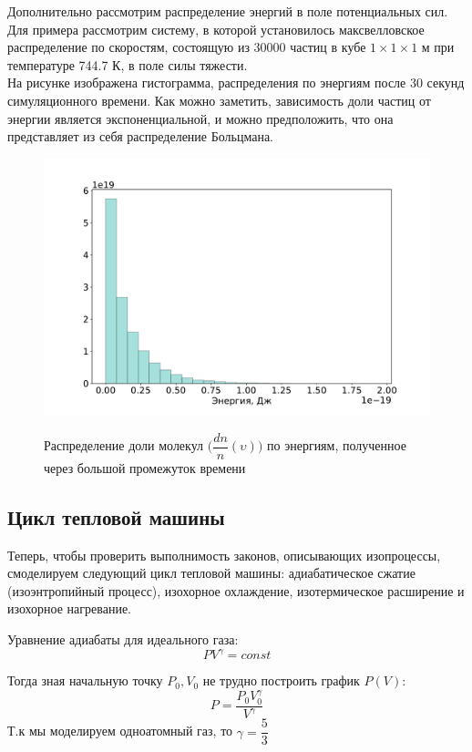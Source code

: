 \documentclass[twoside,twocolumn, 11pt]{article}
\theoremstyle{plain}
\theoremstyle{definition}
\begin{document}
Дополнительно рассмотрим распределение энергий в поле потенциальных сил. Для примера рассмотрим систему, в которой установилось максвелловское распределение по скоростям, состоящую из 30000 частиц в кубе $1 \times 1 \times 1$ м при температуре 744.7 К, в поле силы тяжести.\\
\indent На рисунке изображена гистограмма, распределения по энергиям после 30 секунд симуляционного времени. Как можно заметить, зависимость доли частиц от энергии является экспоненциальной, и можно предположить, что она представляет из себя распределение Больцмана.

\begin{figure}[!h]
{\includegraphics[width=1\linewidth]{hist_E}}
\caption{Распределение доли молекул $\Big(\dfrac{dn}{n} (\upsilon) \Big)$ по энергиям, полученное через большой промежуток времени}
\end{figure}

\subsection{Цикл тепловой машины}
Теперь, чтобы проверить выполнимость законов, описывающих изопроцессы, смоделируем следующий цикл тепловой машины:
адиабатическое сжатие (изоэнтропийный процесс), изохорное охлаждение, изотермическое расширение и изохорное нагревание.

Уравнение адиабаты для идеального газа:
\[PV^\gamma = const \]

Тогда зная начальную точку $P_0, V_0$ не трудно построить график $P(V)$:
\[P = \dfrac{P_0 V_0^\gamma}{V ^\gamma} \]
Т.к мы моделируем одноатомный газ, то $\gamma = \dfrac{5}{3}$
\end{document}
